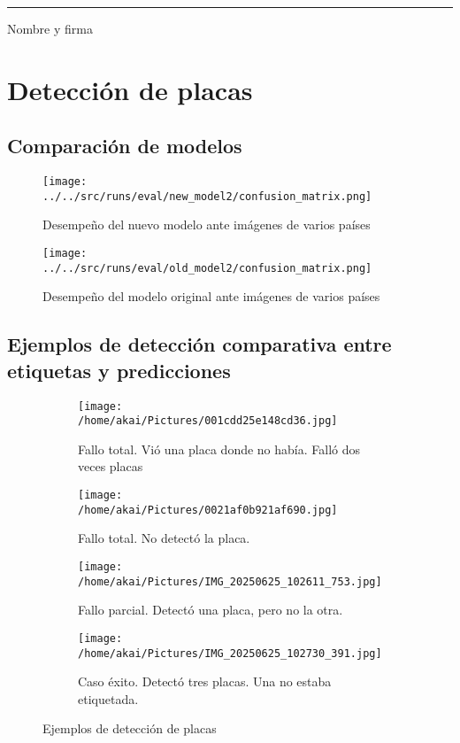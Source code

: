 \documentclass[12pt,a4paper]{article}
\begin{document}
\noindent\rule{8cm}{0.4pt}  
Nombre y firma

\newpage

\section{Detección de placas}
\subsection{Comparación de modelos}

\begin{figure}[H]
	\centering
	\texttt{[image: ../../src/runs/eval/new\_model2/confusion\_matrix.png]}
	\caption{Desempeño del nuevo modelo ante imágenes de varios países}
	\label{fig:yolo_new}
\end{figure}

\begin{figure}[H]
	\centering
	\texttt{[image: ../../src/runs/eval/old\_model2/confusion\_matrix.png]}
	\caption{Desempeño del modelo original ante imágenes de varios países}
	\label{fig:yolo_old}
\end{figure}

\subsection{Ejemplos de detección comparativa entre etiquetas y predicciones} 

\begin{figure}[H]
	\centering
	\begin{subfigure}[b]{0.45\textwidth}
		\centering
		\texttt{[image: /home/akai/Pictures/001cdd25e148cd36.jpg]}
		\caption{Fallo total. Vió una placa donde no había. Falló dos veces placas}
		\label{fig:det_fail1}
	\end{subfigure}
	\hfill
	\begin{subfigure}[b]{0.45\textwidth}
		\centering
		\texttt{[image: /home/akai/Pictures/0021af0b921af690.jpg]}
		\caption{Fallo total. No detectó la placa.}
		\label{fig:det_fail2}
	\end{subfigure}

	\begin{subfigure}[b]{0.45\textwidth}
		\centering
		\texttt{[image: /home/akai/Pictures/IMG\_20250625\_102611\_753.jpg]}
		\caption{Fallo parcial. Detectó una placa, pero no la otra.}
		\label{fig:det_fail3}
	\end{subfigure}
	\hfill
	\begin{subfigure}[b]{0.45\textwidth}
		\centering
		\texttt{[image: /home/akai/Pictures/IMG\_20250625\_102730\_391.jpg]}
		\caption{Caso éxito. Detectó tres placas. Una no estaba etiquetada.}
		\label{fig:det_success}
	\end{subfigure}

	\caption{Ejemplos de detección de placas}
	\label{fig:eje_det}
\end{figure}
\end{document}
